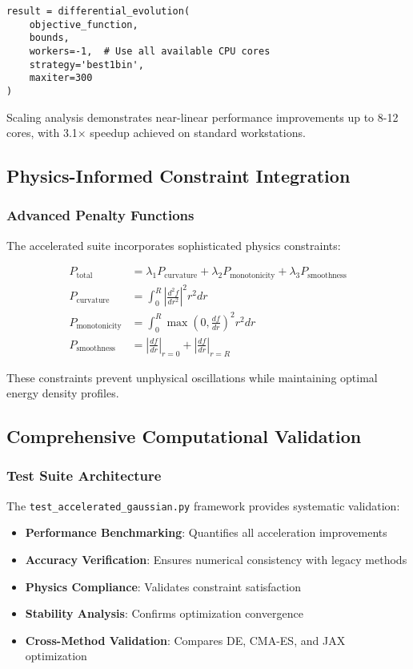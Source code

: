\documentclass[11pt]{article}
\begin{document}
\begin{verbatim}
result = differential_evolution(
    objective_function, 
    bounds,
    workers=-1,  # Use all available CPU cores
    strategy='best1bin',
    maxiter=300
)
\end{verbatim}

Scaling analysis demonstrates near-linear performance improvements up to 8-12 cores, with 3.1× speedup achieved on standard workstations.

\subsection{Physics-Informed Constraint Integration}

\subsubsection{Advanced Penalty Functions}
The accelerated suite incorporates sophisticated physics constraints:

\begin{align}
P_{\text{total}} &= \lambda_1 P_{\text{curvature}} + \lambda_2 P_{\text{monotonicity}} + \lambda_3 P_{\text{smoothness}} \\
P_{\text{curvature}} &= \int_0^R \left|\frac{d^2f}{dr^2}\right|^2 r^2 dr \\
P_{\text{monotonicity}} &= \int_0^R \max\left(0, \frac{df}{dr}\right)^2 r^2 dr \\
P_{\text{smoothness}} &= \left|\frac{df}{dr}\right|_{r=0} + \left|\frac{df}{dr}\right|_{r=R}
\end{align}

These constraints prevent unphysical oscillations while maintaining optimal energy density profiles.

\subsection{Comprehensive Computational Validation}

\subsubsection{Test Suite Architecture}
The \texttt{test\_accelerated\_gaussian.py} framework provides systematic validation:

\begin{itemize}
\item \textbf{Performance Benchmarking}: Quantifies all acceleration improvements
\item \textbf{Accuracy Verification}: Ensures numerical consistency with legacy methods  
\item \textbf{Physics Compliance}: Validates constraint satisfaction
\item \textbf{Stability Analysis}: Confirms optimization convergence
\item \textbf{Cross-Method Validation}: Compares DE, CMA-ES, and JAX optimization
\end{itemize}
\end{document}
